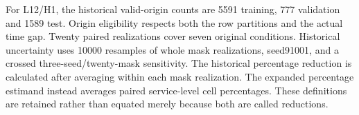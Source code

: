 For L12/H1, the historical valid-origin counts are 5591 training, 777 validation and 1589 test. Origin eligibility respects both the row partitions and the actual time gap. Twenty paired realizations cover seven original conditions. Historical uncertainty uses 10000 resamples of whole mask realizations, seed91001, and a crossed three-seed/twenty-mask sensitivity. The historical percentage reduction is calculated after averaging within each mask realization. The expanded percentage estimand instead averages paired service-level cell percentages. These definitions are retained rather than equated merely because both are called reductions.

